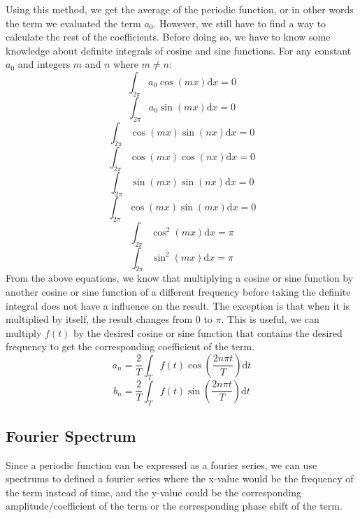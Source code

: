 \documentclass[12pt]{article}
\begin{document}
\indent Using this method, we get the average of the periodic function, 
or in other words the term we evaluated the term $a_0$. However, 
we still have to find a way to calculate the rest of the coefficients.
Before doing so, we have to know some knowledge about definite integrals of cosine and sine functions. 
For any constant $a_0$ and integers $m$ and $n$ where $m\not=n$:
$$      \int_{2\pi} a_0\cos(mx) \mathrm{d}x    =   0            $$
$$      \int_{2\pi} a_0\sin(mx) \mathrm{d}x    =   0            $$
$$      \int_{2\pi} \cos(mx)\sin(nx) \mathrm{d}x    =   0       $$
$$      \int_{2\pi} \cos(mx)\cos(nx) \mathrm{d}x    =   0       $$
$$      \int_{2\pi} \sin(mx)\sin(nx) \mathrm{d}x    =   0       $$
$$      \int_{2\pi} \cos(mx)\sin(mx) \mathrm{d}x    =   0       $$
$$      \int_{2\pi} \cos^2(mx) \mathrm{d}x    =   \pi           $$
$$      \int_{2\pi} \sin^2(mx) \mathrm{d}x    =   \pi           $$
\indent From the above equations, we know that multiplying a cosine or sine function by 
another cosine or sine function of a different frequency before taking the definite integral 
does not have a influence on the result. The exception is that when it is multiplied by itself, 
the result changes from $0$ to $\pi$. This is useful, 
we can multiply $f(t)$ by the desired cosine or sine function that contains the desired frequency 
to get the corresponding coefficient of the term.
\begin{equation}
    a_n =   \frac{2}{T} \int_{T} f(t)\cos(\frac{2n\pi t}{T}) \mathrm{d}t
    \label{equ:trig_fourier_series_cosine_coeff}
\end{equation}
\begin{equation}
    b_n =   \frac{2}{T} \int_{T} f(t)\sin(\frac{2n\pi t}{T}) \mathrm{d}t
    \label{equ:trig_fourier_series_sine_coeff}
\end{equation}



\subsection{Fourier Spectrum}
Since a periodic function can be expressed as a fourier series, 
we can use spectrums to defined a fourier series where the x-value would be the frequency of the term instead of time,
and the y-value could be the corresponding amplitude/coefficient of the term 
or the corresponding phase shift of the term. 
\end{document}
